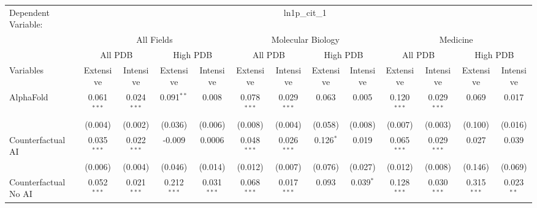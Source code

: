 \begingroup
\centering
\begin{tabular}{lcccccccccccc}
   \tabularnewline \midrule \midrule
   Dependent Variable: & \multicolumn{12}{c}{ln1p\_cit\_1}\\
 & \multicolumn{4}{c}{All Fields} & \multicolumn{4}{c}{Molecular Biology} & \multicolumn{4}{c}{Medicine} \\
\cmidrule(lr){2-5} \cmidrule(lr){6-9} \cmidrule(lr){10-13}
 & \multicolumn{2}{c}{All PDB} & \multicolumn{2}{c}{High PDB} & \multicolumn{2}{c}{All PDB} & \multicolumn{2}{c}{High PDB} & \multicolumn{2}{c}{All PDB} & \multicolumn{2}{c}{High PDB} \\
\cmidrule(lr){2-3} \cmidrule(lr){4-5} \cmidrule(lr){6-7} \cmidrule(lr){8-9} \cmidrule(lr){10-11} \cmidrule(lr){12-13}
Variables & \multicolumn{1}{c}{Extensive} & \multicolumn{1}{c}{Intensive} & \multicolumn{1}{c}{Extensive} & \multicolumn{1}{c}{Intensive} & \multicolumn{1}{c}{Extensive} & \multicolumn{1}{c}{Intensive} & \multicolumn{1}{c}{Extensive} & \multicolumn{1}{c}{Intensive} & \multicolumn{1}{c}{Extensive} & \multicolumn{1}{c}{Intensive} & \multicolumn{1}{c}{Extensive} & \multicolumn{1}{c}{Intensive} \\
\cmidrule(lr){1-1}\cmidrule(lr){2-2} \cmidrule(lr){3-3} \cmidrule(lr){4-4} \cmidrule(lr){5-5} \cmidrule(lr){6-6} \cmidrule(lr){7-7} \cmidrule(lr){8-8} \cmidrule(lr){9-9} \cmidrule(lr){10-10} \cmidrule(lr){11-11} \cmidrule(lr){12-12} \cmidrule(lr){13-13}
   AlphaFold                                & 0.061$^{***}$ & 0.024$^{***}$   & 0.091$^{**}$  & 0.008          & 0.078$^{***}$ & 0.029$^{***}$   & 0.063       & 0.005          & 0.120$^{***}$ & 0.029$^{***}$  & 0.069         & 0.017\\   
                                            & (0.004)       & (0.002)         & (0.036)       & (0.006)        & (0.008)       & (0.004)         & (0.058)     & (0.008)        & (0.007)       & (0.003)        & (0.100)       & (0.016)\\   
   Counterfactual AI                        & 0.035$^{***}$ & 0.022$^{***}$   & -0.009        & 0.0006         & 0.048$^{***}$ & 0.026$^{***}$   & 0.126$^{*}$ & 0.019          & 0.065$^{***}$ & 0.029$^{***}$  & 0.027         & 0.039\\   
                                            & (0.006)       & (0.004)         & (0.046)       & (0.014)        & (0.012)       & (0.007)         & (0.076)     & (0.027)        & (0.012)       & (0.008)        & (0.146)       & (0.069)\\   
   Counterfactual No AI                     & 0.052$^{***}$ & 0.021$^{***}$   & 0.212$^{***}$ & 0.031$^{***}$  & 0.068$^{***}$ & 0.017$^{***}$   & 0.093       & 0.039$^{*}$    & 0.128$^{***}$ & 0.030$^{***}$  & 0.315$^{***}$ & 0.023$^{**}$\\   

\end{tabular}
